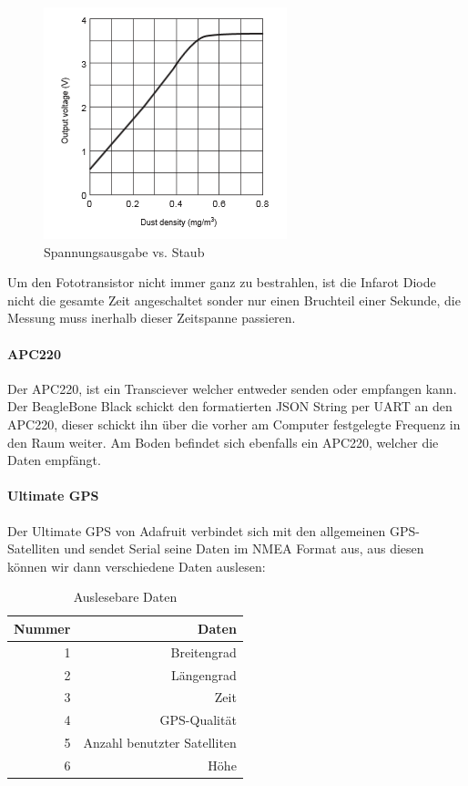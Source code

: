 \begin{figure}[h]
	\centering
	\includegraphics[scale=0.5]{2_Beschreibung_des_CANSAT/graph_photodiode_sharp.png}
	\caption{Spannungsausgabe vs. Staub}
	\label{graph photodiode}
\end{figure}

Um den Fototransistor nicht immer ganz zu bestrahlen, ist die Infarot Diode nicht die gesamte Zeit angeschaltet sonder nur einen Bruchteil einer Sekunde, die Messung muss inerhalb dieser Zeitspanne passieren.

\paragraph{APC220}
Der APC220, ist ein Transciever welcher entweder senden oder empfangen kann. Der BeagleBone Black schickt den formatierten JSON String per UART an den APC220, dieser schickt ihn über die vorher am Computer festgelegte Frequenz in den Raum weiter. Am Boden befindet sich ebenfalls ein APC220, welcher die Daten empfängt.

\paragraph{Ultimate GPS}
Der Ultimate GPS von Adafruit verbindet sich mit den allgemeinen GPS-Satelliten und sendet Serial seine Daten im NMEA Format aus, aus diesen können wir dann verschiedene Daten auslesen:

\begin{table}[H]
  \centering
    \begin{tabular}{rr}
    \toprule
    \textbf{Nummer} & \textbf{Daten} \\
    \midrule 
    1 & Breitengrad \\
    2 & Längengrad \\
    3 & Zeit \\
    4 & GPS-Qualität \\
    5 & Anzahl benutzter Satelliten \\
    6 & Höhe \\
    \bottomrule
    \end{tabular}
    \caption{Auslesebare Daten}
\end{table}

